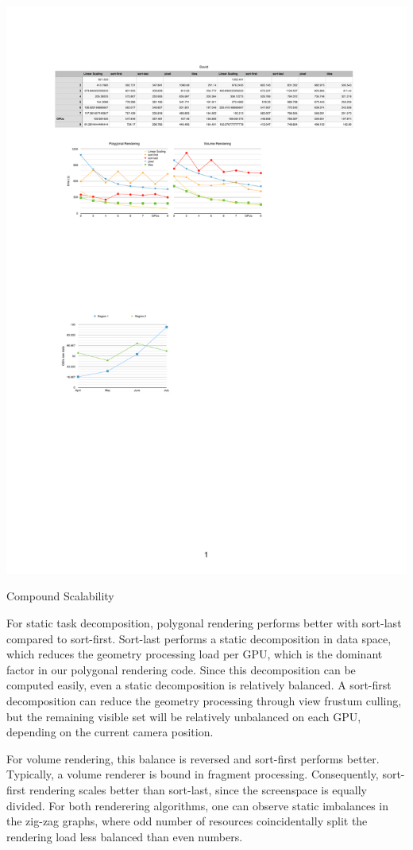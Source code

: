 \begin{benchmark}[h!t]\center
 \includegraphics[width=\columnwidth]{results/static}
 {\caption{\label{rStatic}Compound Scalability}}
\end{benchmark}


For static task decomposition, polygonal rendering performs better with
sort-last compared to sort-first. Sort-last performs a static decomposition in
data space, which reduces the geometry processing load per GPU, which is the
dominant factor in our polygonal rendering code. Since this decomposition can
be computed easily, even a static decomposition is relatively balanced. A
sort-first decomposition can reduce the geometry processing through view
frustum culling, but the remaining visible set will be relatively unbalanced on
each GPU, depending on the current camera position.

For volume rendering, this balance is reversed and sort-first performs better.
Typically, a volume renderer is bound in fragment processing. Consequently,
sort-first rendering scales better than sort-last, since the screenspace is
equally divided. For both renderering algorithms, one can observe static
imbalances in the zig-zag graphs, where odd number of resources coincidentally
split the rendering load less balanced than even numbers.

